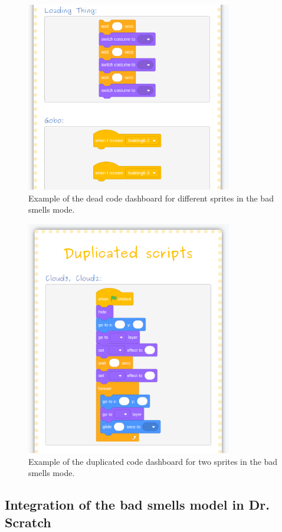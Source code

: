 \begin{figure}
    \centering
    \includegraphics[width=9cm,                         keepaspectratio]{img/dead_code.png}
    \caption{Example of the dead code dashboard for different sprites in the bad smells mode.}
    \label{fig:dead_code}
\end{figure}

\begin{figure}
    \centering
    \includegraphics[width=9cm,                         keepaspectratio]{img/dup_code.png}
    \caption{Example of the duplicated code dashboard for two sprites in the bad smells mode.}
    \label{fig:dup_code}
\end{figure}


\subsection{Integration of the bad smells model in Dr. Scratch}
\label{subsec:integration_newmodel}

